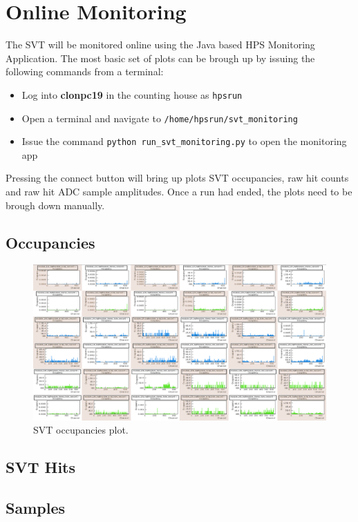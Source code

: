 
\section {Online Monitoring}

The SVT will be monitored online using the Java based HPS Monitoring Application.
The most basic set of plots can be brough up by issuing the following commands 
from a terminal:  

\begin {itemize}
    \item Log into \textbf{clonpc19} in the counting house as \texttt{hpsrun}
    \item Open a terminal and navigate to \texttt{/home/hpsrun/svt\_monitoring}
    \item Issue the command \texttt{python run\_svt\_monitoring.py} to open the monitoring app
\end {itemize}
Pressing the connect button will bring up plots SVT occupancies, raw hit counts
and raw hit ADC sample amplitudes.  Once a run had ended, the plots need to be 
brough down manually.

\subsection {Occupancies}

\begin{figure}[h!]
    \centering
    \includegraphics[width=\textwidth]{figures/occupancy_monitoring_app.png}
    \caption{SVT occupancies plot.}
    \label{fig:occupancies}
\end{figure}

\subsection {SVT Hits}

\subsection {Samples}



